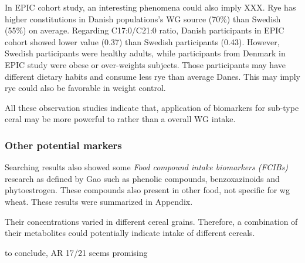 In EPIC cohort study, an interesting phenomena could also imply XXX. Rye has higher constitutions in Danish populations's WG source (70\%) than Swedish (55\%) on average. Regarding C17:0/C21:0 ratio, Danish participants in EPIC cohort showed lower value (0.37) than Swedish participants (0.43). 
However, Swedish participants were healthy adults, while participants from Denmark in EPIC study were obese or over-weights subjects. Those participants may have different dietary habits and consume less rye than average Danes. This may imply rye could also be favorable in weight control.

All these observation studies indicate that, application of biomarkers for sub-type ceral may be more powerful to rather than a overall WG intake.




\subsubsection{Other potential markers}
Searching results also showed some \textit{Food compound intake biomarkers (FCIBs)} research as defined by Gao\cite{Gao2017} such as phenolic compounds\cite{ISI:000389134200003}, benzoxazinoids\cite{ISI:000394168100034} and phytoestrogen\cite{ISI:000384082300001}. These compounds also present in other food,  not specific for \acrshort{wg} wheat. These results were summarized in Appendix.

Their concentrations varied in different cereal grains. Therefore, a combination of their metabolites could potentially indicate intake of different cereals.


to conclude, AR 17/21 seems promising 